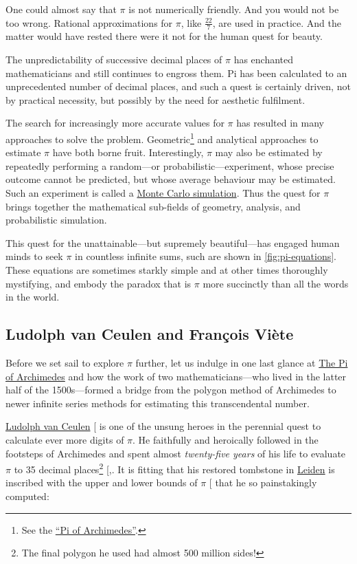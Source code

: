 \documentclass[
  a4paper,
]{article}
\begin{document}
One could almost say that \(\pi\) is not numerically friendly. And you
would not be too wrong. Rational approximations for \(\pi\), like
\(\frac{22}{7}\), are used in practice. And the matter would have rested
there were it not for the human quest for beauty.

The unpredictability of successive decimal places of \(\pi\) has
enchanted mathematicians and still continues to engross them. Pi has
been calculated to an unprecedented number of decimal places, and such a
quest is certainly driven, not by practical necessity, but possibly by
the need for aesthetic fulfilment.

The search for increasingly more accurate values for \(\pi\) has
resulted in many approaches to solve the problem. Geometric\footnote{See
  the
  \href{https://swanlotus.netlify.app/blogs/the-pi-of-archimedes}{``Pi
  of Archimedes''}.} and analytical approaches to estimate \(\pi\) have
both borne fruit. Interestingly, \(\pi\) may also be estimated by
repeatedly performing a random---or probabilistic---experiment, whose
precise outcome cannot be predicted, but whose average behaviour may be
estimated. Such an experiment is called a
\href{https://www.ibm.com/topics/monte-carlo-simulation}{Monte Carlo
simulation}. Thus the quest for \(\pi\) brings together the mathematical
sub-fields of geometry, analysis, and probabilistic simulation.

This quest for the unattainable---but supremely beautiful---has engaged
human minds to seek \(\pi\) in countless infinite sums, such are shown
in \cref{fig:pi-equations}. These equations are sometimes starkly simple
and at other times thoroughly mystifying, and embody the paradox that is
\(\pi\) more succinctly than all the words in the world.

\subsection{Ludolph van Ceulen and François
Viète}\label{ludolph-van-ceulen-and-franuxe7ois-viuxe8te}

Before we set sail to explore \(\pi\) further, let us indulge in one
last glance at
\href{https://swanlotus.netlify.app/blogs/the-pi-of-archimedes}{The Pi
of Archimedes} and how the work of two mathematicians---who lived in the
latter half of the 1500s---formed a bridge from the polygon method of
Archimedes to newer infinite series methods for estimating this
transcendental number.

\href{https://en.wikipedia.org/wiki/Ludolph_van_Ceulen}{Ludolph van
Ceulen} {[}\citeproc{ref-van-ceulen}{10}{]} is one of the unsung heroes
in the perennial quest to calculate ever more digits of \(\pi\). He
faithfully and heroically followed in the footsteps of Archimedes and
spent almost \emph{twenty-five years} of his life to evaluate \(\pi\) to
35 decimal places\footnote{The final polygon he used had almost 500
  million sides!}
{[},\citeproc{ref-van-ceulen-memorial}{11}{]}.
It is fitting that his restored tombstone in
\href{https://en.wikipedia.org/wiki/Leiden}{Leiden} is inscribed with
the upper and lower bounds of \(\pi\) {[}\citeproc{ref-tombstone}{12}{]}
that he so painstakingly computed:
\end{document}
